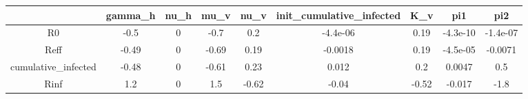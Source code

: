 \begin{tabular}{|c|c|c|c|c|c|c|c|c|}
\hline
& gamma_h & nu_h & mu_v & nu_v & init_cumulative_infected & K_v & pi1 & pi2 \\
\hline
R0 & -0.5 & 0 & -0.7 & 0.2 & -4.4e-06 & 0.19 & -4.3e-10 & -1.4e-07 \\
\hline
Reff & -0.49 & 0 & -0.69 & 0.19 & -0.0018 & 0.19 & -4.5e-05 & -0.0071 \\
\hline
cumulative_infected & -0.48 & 0 & -0.61 & 0.23 & 0.012 & 0.2 & 0.0047 & 0.5 \\
\hline
Rinf & 1.2 & 0 & 1.5 & -0.62 & -0.04 & -0.52 & -0.017 & -1.8 \\
\hline
\end{tabular}
